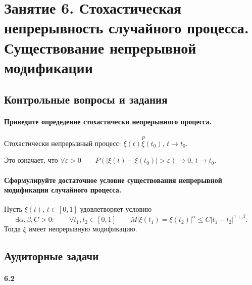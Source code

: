 \chapter*{Занятие 6. Стохастическая непрерывность случайного процесса.
          Существование непрерывной модификации}

\section*{Контрольные вопросы и задания}

\subsubsection*{Приведите опредедение стохастически непрерывного процесса.}

Стохастически непрерывный процесс:
$ \xi \left( t \right) \overset{P} \xi \left( t_0 \right), \, t \to t_0$.

Это означает, что
$ \forall \varepsilon > 0 \qquad
  P \left( \left| \xi \left( t \right) - \xi \left( t_0 \right) \right| > \varepsilon \right) \to 0,
  \, t \to t_0$.

\subsubsection*{Сформулируйте достаточное условие существования непрерывной модификации случайного
                процесса.}

Пусть $ \xi \left( t \right), \, t \in \left[ 0, 1 \right] $ удовлетворяет условию
$$ \exists \alpha, \beta, C > 0: \qquad
  \forall t_1, t_2 \in \left[ 0, 1 \right] \qquad
  M \left| \xi \left( t_1 \right) =
  \xi \left( t_2 \right) \right|^{ \alpha } \leq C \left| t_1 - t_2 \right|^{1 + \beta }.$$
Тогда $ \xi $ имеет непрерывную модификацию.

\section*{Аудиторные задачи}

\subsubsection*{6.2}


